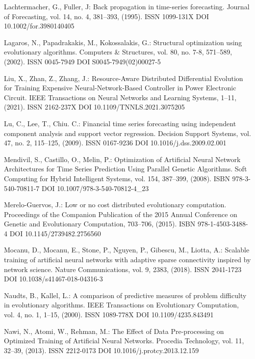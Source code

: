 \begin{thebibliography}{99.}
 Lachtermacher, G., Fuller, J: Back propagation in time-series forecasting. Journal of Forecasting, vol. 14, no. 4, 381--393, (1995). ISSN 1099-131X DOI 10.1002/for.3980140405

 Lagaros, N., Papadrakakis, M., Kokossalakis, G.: Structural optimization using evolutionary algorithms. Computers \& Structures, vol. 80, no. 7-8, 571--589, (2002). ISSN 0045-7949 DOI S0045-7949(02)00027-5

 Liu, X., Zhan, Z., Zhang, J.: Resource-Aware Distributed Differential Evolution for Training Expensive Neural-Network-Based Controller in Power Electronic Circuit. IEEE Transactions on Neural Networks and Learning Systems, 1--11, (2021). ISSN 2162-237X DOI 10.1109/TNNLS.2021.3075205

 Lu, C., Lee, T., Chiu. C.: Financial time series forecasting using independent component analysis and support vector regression. Decision Support Systems, vol. 47, no. 2, 115--125, (2009). ISSN 0167-9236 DOI 10.1016/j.dss.2009.02.001

 Mendivil, S., Castillo, O., Melin, P.: Optimization of Artificial Neural Network Architectures for Time Series Prediction Using Parallel Genetic Algorithms. Soft Computing for Hybrid Intelligent Systems, vol. 154, 387--399, (2008). ISBN 978-3-540-70811-7 DOI 10.1007/978-3-540-70812-4\_23

 Merelo-Guervos, J.: Low or no cost distributed evolutionary computation. Proceedings of the Companion Publication of the 2015 Annual Conference on Genetic and Evolutionary Computation, 703--706, (2015). ISBN 978-1-4503-3488-4 DOI 10.1145/2739482.2756560

 Mocanu, D., Mocanu, E., Stone, P., Nguyen, P., Gibescu, M., Liotta, A.: Scalable training of artificial neural networks with adaptive sparse connectivity inspired by network science. Nature Communications, vol. 9, 2383, (2018). ISSN 2041-1723 DOI 10.1038/s41467-018-04316-3

 Naudts, B., Kallel, L.: A comparison of predictive measures of problem difficulty in evolutionary algorithms. IEEE Transactions on Evolutionary Computation, vol. 4, no. 1, 1--15, (2000). ISSN 1089-778X DOI 10.1109/4235.843491

 Nawi, N., Atomi, W., Rehman, M.: The Effect of Data Pre-processing on Optimized Training of Artificial Neural Networks. Procedia Technology, vol. 11, 32--39, (2013). ISSN 2212-0173 DOI 10.1016/j.protcy.2013.12.159


\end{thebibliography}
